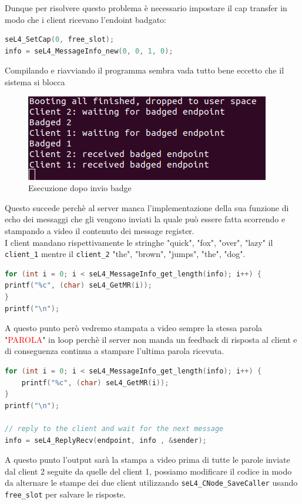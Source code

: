 Dunque per risolvere questo problema è necessario impostare il cap transfer in modo che i client ricevano l'endoint badgato:
\begin{lstlisting}[language=C++]
seL4_SetCap(0, free_slot);
info = seL4_MessageInfo_new(0, 0, 1, 0);
\end{lstlisting}
Compilando e riavviando il programma sembra vada tutto bene eccetto che il sistema si blocca
\begin{figure}[h]
  \includegraphics[width=\linewidth]{img/DopoBadgeIPC.png}
  \caption{Esecuzione dopo invio badge}
  \label{fig:TutorialThreads}
\end{figure}
Questo succede perchè al server manca l'implementazione della sua funzione di echo dei messaggi che gli vengono inviati la quale può essere fatta scorrendo e stampando a video il contenuto dei message register.\\
I client mandano rispettivamente le stringhe {"quick", "fox", "over", "lazy"} il \texttt{client\_1} mentre il \texttt{client\_2} {"the", "brown", "jumps", "the", "dog"}.
\begin{lstlisting}[language=C++]
for (int i = 0; i < seL4_MessageInfo_get_length(info); i++) {
printf("%c", (char) seL4_GetMR(i));
}
printf("\n");
\end{lstlisting}
A questo punto però vedremo stampata a video sempre la stessa parola "\textcolor{red}{PAROLA}" in loop perchè il server non manda un feedback di risposta al client e di conseguenza continua a stampare l'ultima parola ricevuta.
\begin{lstlisting}[language=C++]
for (int i = 0; i < seL4_MessageInfo_get_length(info); i++) {
	printf("%c", (char) seL4_GetMR(i));
}
printf("\n");

// reply to the client and wait for the next message
info = seL4_ReplyRecv(endpoint, info , &sender);
\end{lstlisting}
A questo punto l'output sarà la stampa a video prima di tutte le parole inviate dal client 2 seguite da quelle del client 1, possiamo modificare il codice in modo da alternare le stampe dei due client utilizzando \texttt{seL4\_CNode\_SaveCaller} usando \texttt{free\_slot} per salvare le risposte.
